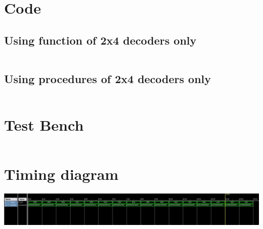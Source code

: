 \documentclass[titlepage]{article}
\begin{document}
    \section{Code}
    \subsection{Using function of 2x4 decoders only}
    \inputminted{vhdl}{./codes/ass3_annex2a.vhd}
    \subsection{Using procedures of 2x4 decoders only}
    \inputminted{vhdl}{./codes/ass3_annex2b.vhd}
    \section{Test Bench}
    \inputminted{vhdl}{./codes/tb_a3_ax1.vhd}
    \section{Timing diagram}
    \includegraphics[width=19cm]{./figures/td_4x16.jpeg}
\end{document}
